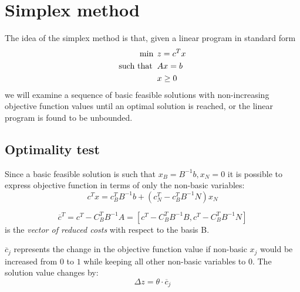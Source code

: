 \documentclass[12pt, a4paper]{report}
\begin{document}
    \section{Simplex method}
    The idea of the simplex method is that, given a linear program in standard form
    \begin{align*}
        \min                      \:&\: z=c^Tx              \\
        \textnormal{such that }     &\: Ax=b                \\
                                    &\: x \geq 0
    \end{align*}
    we will examine a sequence of basic feasible solutions with non-increasing objective function values until an optimal solution is reached, or the  linear program is 
    found to be unbounded. 
    
    \subsection{Optimality test}
    Since a basic feasible solution is such that $x_B=B^{-1}b,x_N=0$ it is possible to express objective function in terms of only the non-basic variables: 
    \[c^Tx=c_B^TB^{-1}b+\left(c_N^T-c_B^TB^{-1}N\right)x_N\]
    \begin{definition}
        \[\overline{c}^T=c^T-C_B^TB^{-1}A=\left[c^T-C_B^TB^{-1}B,c^T-C_B^TB^{-1}N\right]\]
        is the \emph{vector of reduced costs} with respect to the basis B. 
    \end{definition}
    $\overline{c}_j$ represents the change in the objective function value if non-basic $x_j$ would be increased from $0$ to $1$ while keeping all other non-basic 
    variables to 0. The solution value changes by: 
    \[\Delta z=\theta \cdot \overline{c}_j\]
\end{document}

